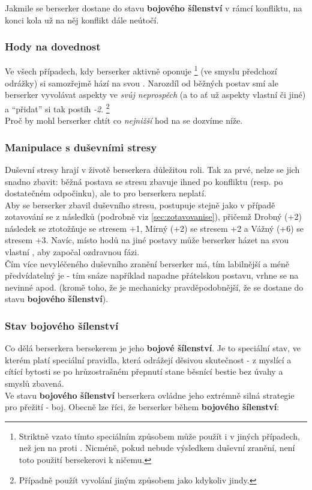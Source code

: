Jakmile se berserker dostane do stavu \textbf{bojového šílenství} v rámcí konfliktu, na konci kola už na něj konflikt dále neútočí.
\subsubsection*{Hody na dovednost }
Ve všech případech, kdy berserker aktivně oponuje   \footnote{Striktně vzato tímto speciálním způsobem může použít  i v jiných případech, než jen na  proti . Nicméně, pokud nebude výsledkem duševní zranění, není toto použití bersekerovi k ničemu.} (ve smyslu předchozí odrážky) si samozřejmě hází na  svou . Narozdíl od běžných postav smí ale berserker vyvolávat aspekty ve \textit{svůj neprospěch} (a to ať už aspekty vlastní či jiné) a ``přidat'' si tak postih \textit{-2}. \footnote{Případně použít vyvolání jiným způsobem jako kdykoliv jindy.}\\
Proč by mohl berserker chtít co \textit{nejnižší} hod na  se dozvíme níže.

\subsubsection*{Manipulace s duševními stresy}
Duševní stresy hrají v životě berserkera důležitou roli. Tak za prvé, nelze se jich snadno zbavit: běžná postava se stresu zbavuje ihned po konfliktu (resp. po dostatečném odpočinku), ale to pro berserkera neplatí. \\
Aby se berserker zbavil duševního stresu, postupuje stejně jako v případě zotavování se z následků (podrobně viz \ref{sec:zotavovanise}), přičemž Drobný (+2) následek se ztotožňuje se stresem +1, Mírný (+2) se stresem +2 a Vážný (+6) se stresem +3. Navíc, místo hodů na  jiné postavy může berserker házet na svou vlastní , aby započal ozdravnou fázi.\\
Čím více nevyléčeného duševního zranění berserker má, tím labilnější a méně předvídatelný je - tím snáze například napadne přátelskou postavu, vrhne se na nevinné apod. (kromě toho, že je mechanicky pravděpodobnější, že se dostane do stavu \textbf{bojového šílenství}).

\subsubsection*{Stav bojového šílenství}
Co dělá berserkera bersekerem je jeho \textbf{bojové šílenství}. Je to speciální stav, ve kterém platí speciální pravidla, která odrážejí děsivou skutečnost - z myslící a cítící bytosti se po hrůzostrašném přepnutí stane běsnící bestie bez úvahy a smyslů zbavená. \\
Ve stavu \textbf{bojového šílenství} berserkera ovládne jeho extrémně silná strategie pro přežití - boj. Obecně lze říci, že berserker během \textbf{bojového šílenství}:

